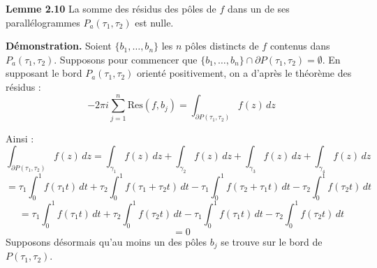 \documentclass{article}
\begin{document}
\textbf{Lemme 2.10} La somme des résidus des pôles de \( f \) dans un de ses parallélogrammes \( P_a(\tau_1,\tau_2) \) est nulle.

\textbf{Démonstration.}
Soient \( \{b_1, \ldots, b_n \}\) les $n$ pôles distincts de \( f \) contenus dans \( P_a(\tau_1, \tau_2) \).
Supposons pour commencer que \( \{b_1, \ldots, b_n\} \cap \partial P(\tau_1, \tau_2) = \emptyset \).
En supposant le bord \( P_a(\tau_1, \tau_2) \) orienté positivement, on a d'après le théorème des résidus :
\[
-2\pi i \sum_{j=1}^n \text{Res}(f, b_j) = \int_{\partial P(\tau_1,\tau_2)} f(z) \, dz
\]

Ainsi :
\[
\int_{\partial P(\tau_1,\tau_2)} f(z) \, dz = \int_{\gamma_1} f(z) \, dz + \int_{\gamma_2} f(z) \, dz + \int_{\gamma_3} f(z) \, dz + \int_{\gamma_4} f(z) \, dz
\]
\[
= \tau_1 \int_0^1 f(\tau_1 t) \, dt + \tau_2 \int_0^1 f(\tau_1 + \tau_2 t) \, dt - \tau_1 \int_0^1 f(\tau_2 + \tau_1 t) \, dt - \tau_2 \int_0^1 f(\tau_2 t) \, dt
\]
\[
= \tau_1 \int_0^1 f(\tau_1 t) \, dt + \tau_2 \int_0^1 f(\tau_2 t) \, dt - \tau_1 \int_0^1 f(\tau_1 t) \, dt - \tau_2 \int_0^1 f(\tau_2 t) \, dt
\]
\[
= 0
\]
Supposons désormais qu'au moins un des pôles \( b_j \) se trouve sur le bord de \( P(\tau_1, \tau_2) \).
\end{document}
